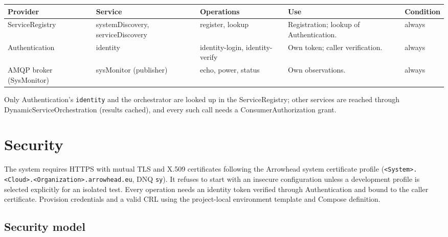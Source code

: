 \documentclass[a4paper]{arrowhead}
\begin{document}
\noindent\begin{longtable}{| >{\raggedright\arraybackslash}p{2.9cm} | >{\raggedright\arraybackslash}p{3.1cm} | >{\raggedright\arraybackslash}p{2.5cm} | p{3.6cm} | >{\raggedright\arraybackslash}p{2.9cm} |} \hline
\rowcolor{gray!33} Provider & Service & Operations & Use & Condition \\ \hline \endhead
ServiceRegistry & systemDiscovery, serviceDiscovery & register, lookup & Registration; lookup of Authentication. & always \\ \hline
Authentication & identity & identity-login, identity-verify & Own token; caller verification. & always \\ \hline
AMQP broker (SysMonitor) & sysMonitor (publisher) & echo, power, status & Own observations. & always \\ \hline
\end{longtable}

Only Authentication's \texttt{identity} and the orchestrator are looked up in the ServiceRegistry; other services are reached through DynamicServiceOrchestration (results cached), and every such call needs a ConsumerAuthorization grant.

\newpage

\section{Security}
\label{sec:security}

The system requires HTTPS with mutual TLS and X.509 certificates following the Arrowhead system certificate profile (\texttt{<System>.<Cloud>.<Organization>.arrowhead.eu}, DNQ \texttt{sy}). It refuses to start with an insecure configuration unless a development profile is selected explicitly for an isolated test. Every operation needs an identity token verified through Authentication and bound to the caller certificate. Provision credentials and a valid CRL using the project-local environment template and Compose definition.

\subsection{Security model}
\end{document}
